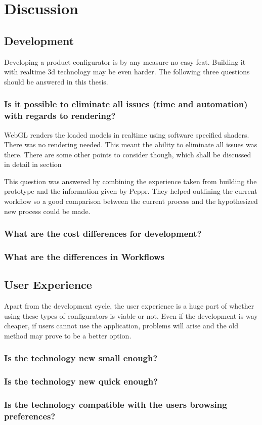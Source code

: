 \chapter{Discussion}
\section{Development}
Developing a product configurator is by any measure no easy feat. Building it with realtime 3d technology may be even harder. The following three questions should be answered in this thesis.

\subsection {Is it possible to eliminate all issues (time and automation) with regards to rendering?}
\label{discuss:developmentElimination}
WebGL renders the loaded models in realtime using software specified shaders. There was no rendering needed. This meant the ability to eliminate all issues was there. There are some other points to consider though, which shall be discussed in detail in section 

This question was answered by combining the experience taken from building the prototype and the information given by Peppr. They helped outlining the current workflow so a good comparison between the current process and the hypothesized new process could be made.


\subsection{What are the cost differences for development?}
\subsection {What are the differences in Workflows}

\section{User Experience}
Apart from the development cycle, the user experience is a huge part of whether using these types of configurators is viable or not. Even if the development is way cheaper, if users cannot use the application, problems will arise and the old method may prove to be a better option.

\subsection {Is the technology new small enough?}
\subsection {Is the technology new quick enough?}
\subsection {Is the technology compatible with the users browsing preferences?}